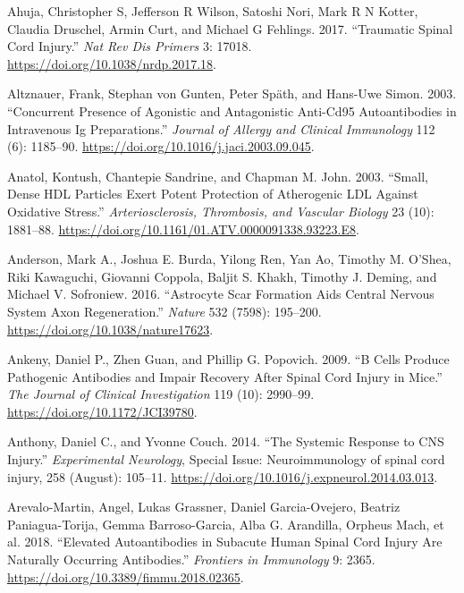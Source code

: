 \documentclass[9pt,lineno]{elife}
\newlength{\cslhangindent}
\newlength{\cslentryspacingunit} %
\newenvironment{CSLReferences}[2] %
 {%
  \setlength{\parindent}{0pt}
  \ifodd #1
  \let\oldpar\par
  \def\par{\hangindent=\cslhangindent\oldpar}
  \fi
  \setlength{\parskip}{#2\cslentryspacingunit}
 }%
 {}
\begin{document}
\hypertarget{refs}{}
\begin{CSLReferences}{1}{0}
\leavevmode{}%
Ahuja, Christopher S, Jefferson R Wilson, Satoshi Nori, Mark R N Kotter, Claudia Druschel, Armin Curt, and Michael G Fehlings. 2017. {``Traumatic Spinal Cord Injury.''} \emph{Nat Rev Dis Primers} 3: 17018. \url{https://doi.org/10.1038/nrdp.2017.18}.

\leavevmode{}%
Altznauer, Frank, Stephan von Gunten, Peter Späth, and Hans-Uwe Simon. 2003. {``Concurrent Presence of Agonistic and Antagonistic Anti-{Cd95} Autoantibodies in Intravenous {Ig} Preparations.''} \emph{Journal of Allergy and Clinical Immunology} 112 (6): 1185--90. \url{https://doi.org/10.1016/j.jaci.2003.09.045}.

\leavevmode{}%
Anatol, Kontush, Chantepie Sandrine, and Chapman M. John. 2003. {``Small, {Dense HDL Particles Exert Potent Protection} of {Atherogenic LDL Against Oxidative Stress}.''} \emph{Arteriosclerosis, Thrombosis, and Vascular Biology} 23 (10): 1881--88. \url{https://doi.org/10.1161/01.ATV.0000091338.93223.E8}.

\leavevmode{}%
Anderson, Mark A., Joshua E. Burda, Yilong Ren, Yan Ao, Timothy M. O'Shea, Riki Kawaguchi, Giovanni Coppola, Baljit S. Khakh, Timothy J. Deming, and Michael V. Sofroniew. 2016. {``Astrocyte Scar Formation Aids Central Nervous System Axon Regeneration.''} \emph{Nature} 532 (7598): 195--200. \url{https://doi.org/10.1038/nature17623}.

\leavevmode{}%
Ankeny, Daniel P., Zhen Guan, and Phillip G. Popovich. 2009. {``B Cells Produce Pathogenic Antibodies and Impair Recovery After Spinal Cord Injury in Mice.''} \emph{The Journal of Clinical Investigation} 119 (10): 2990--99. \url{https://doi.org/10.1172/JCI39780}.

\leavevmode{}%
Anthony, Daniel C., and Yvonne Couch. 2014. {``The Systemic Response to {CNS} Injury.''} \emph{Experimental Neurology}, Special {Issue}: {Neuroimmunology} of spinal cord injury, 258 (August): 105--11. \url{https://doi.org/10.1016/j.expneurol.2014.03.013}.

\leavevmode{}%
Arevalo-Martin, Angel, Lukas Grassner, Daniel Garcia-Ovejero, Beatriz Paniagua-Torija, Gemma Barroso-Garcia, Alba G. Arandilla, Orpheus Mach, et al. 2018. {``Elevated {Autoantibodies} in {Subacute Human Spinal Cord Injury Are Naturally Occurring Antibodies}.''} \emph{Frontiers in Immunology} 9: 2365. \url{https://doi.org/10.3389/fimmu.2018.02365}.


\end{CSLReferences}
\end{document}
